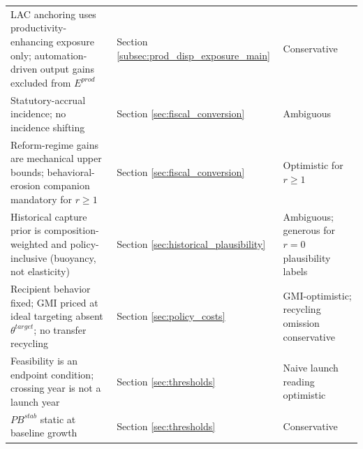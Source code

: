 \documentclass[11pt,a4paper]{article}
\begin{document}
\begin{longtable}{p{}p{}p{}}
LAC anchoring uses productivity-enhancing exposure only; automation-driven output gains excluded from \(E^{prod}\) & Section \ref{subsec:prod_disp_exposure_main} & Conservative \\
Statutory-accrual incidence; no incidence shifting & Section \ref{sec:fiscal_conversion} & Ambiguous \\
Reform-regime gains are mechanical upper bounds; behavioral-erosion companion mandatory for \(r\geq1\) & Section \ref{sec:fiscal_conversion} & Optimistic for \(r\geq1\) \\
Historical capture prior is composition-weighted and policy-inclusive (buoyancy, not elasticity) & Section \ref{sec:historical_plausibility} & Ambiguous; generous for $r=0$ plausibility labels \\
Recipient behavior fixed; GMI priced at ideal targeting absent \(\theta^{target}\); no transfer recycling & Section \ref{sec:policy_costs} & GMI-optimistic; recycling omission conservative \\
Feasibility is an endpoint condition; crossing year is not a launch year & Section \ref{sec:thresholds} & Naive launch reading optimistic \\
\(PB^{stab}\) static at baseline growth & Section \ref{sec:thresholds} & Conservative \\
\bottomrule
\end{longtable}
\end{document}
